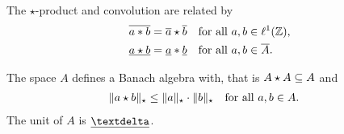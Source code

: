 \begin{lemma}
    The $\star$-product and convolution are related by
    \begin{subequations}
        \begin{align}
            \overline{ a \mathbin{*} b }
            &=
            \overline{a} \star \overline{b}
            &&\text{for all $ a, b \in \ell^{1}( \mathbb{ Z } ) $,}
            \\
            \underline{ a \star b }
            &=
            \underline{ a } \mathbin{*} \underline{ b }
            &&\text{for all $ a, b \in \overline{A} $.}
        \end{align}
    \end{subequations}
\end{lemma}

\begin{theorem}
    The space $ A $ defines a Banach algebra with,
    that is $ A \star A \subseteq A $ and
    \begin{align}
        \lVert  a \star b  \rVert_\star
        \leq
        \lVert  a  \rVert_\star \cdot \lVert  b  \rVert_\star
        &&&\text{for all $ a, b \in A $.}
    \end{align}
    The unit of $ A $ is $ \underline{\sfdeo} $.
\end{theorem}

